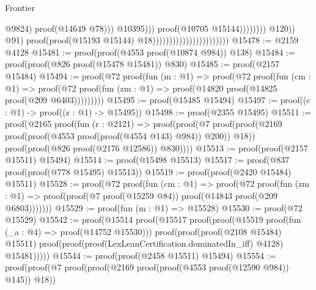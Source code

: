 \begin{lexlean}{Frontier}
\begin{coremodule}
                                                                                                                      @9824)
                                                                                                                    proof(@14649
                                                                                                                        @78)))
                                                                                                              @10395)))
                                                                                                    proof(@10705
                                                                                                        @15144))))))))
                                                                          @120))
                                                                    @91)
                                                                  proof(proof(@15193 @15144)
                                                                      @18)))))))))))))))))))))))
@15478 := @2159 @4128
@15481 := proof(proof(@4553 proof(@10874 @984)) @138)
@15484 := proof(proof(@826 proof(@15478 @15481)) @830)
@15485 := proof(@2157 @15484)
@15494 := proof(@72
      proof(fun (m : @1) =>
        proof(@72
            proof(fun (cm : @1) =>
              proof(@72 proof(fun (zm : @1) => proof(@14820 proof(@14825 proof(@209 @6403)))))))))
@15495 := proof(@15485 @15494)
@15497 := proof((c : @1) -> proof((z : @1) -> @15495))
@15498 := proof(@2355 @15495)
@15511 := proof(@2165
      proof(fun (r : @2121) =>
        proof(proof(@7
              proof(proof(@2169 proof(proof(@4553 proof(proof(@4554 @143) @984)) @200)) @18))
            proof(proof(@826 proof(@2176 @12586)) @830))))
@15513 := proof(proof(@2157 @15511) @15494)
@15514 := proof(@15498 @15513)
@15517 := proof(@837 proof(proof(@778 @15495) @15513))
@15519 := proof(proof(@2420 @15484) @15511)
@15528 := proof(@72
      proof(fun (cm : @1) =>
        proof(@72
            proof(fun (zm : @1) =>
              proof(proof(@7 proof(@15259 @84)) proof(@14843 proof(@209 @6803)))))))
@15529 := proof(fun (m : @1) => @15528)
@15530 := proof(@72 @15529)
@15542 := proof(@15514
      proof(@15517
          proof(proof(@15519 proof(fun (_a : @4) => proof(@14752 @15530)))
              proof(proof(proof(@2108 @15484) @15511)
                  proof(proof(proof(LexLeanCertification.dominatedIn_iff) @4128) @15481)))))
@15544 := proof(proof(@2458 @15511) @15494)
@15554 := proof(proof(@7 proof(proof(@2169 proof(proof(@4553 proof(@12590 @984)) @145)) @18))

\end{coremodule}
\end{lexlean}
